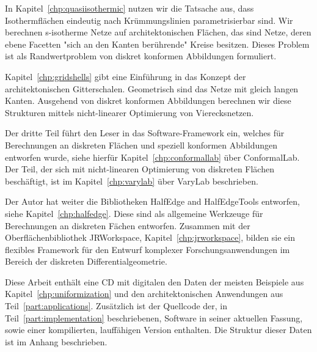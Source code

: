 \documentclass[Thesis.tex]{subfiles}
\begin{document}
In Kapitel~\ref{chp:quasiisothermic} nutzen wir die Tatsache aus, dass Isothermfl\"{a}chen eindeutig nach Kr\"{u}mmungslinien parametrisierbar sind.
Wir berechnen s-isotherme Netze auf architektonischen Fl\"{a}chen, das sind Netze, deren ebene Facetten "sich an den Kanten ber\"{u}hrende" Kreise besitzen.
Dieses Problem ist als Randwertproblem von diskret konformen Abbildungen formuliert.

Kapitel~\ref{chp:gridshells} gibt eine Einf\"{u}hrung in das Konzept der architektonischen Gitterschalen.
Geometrisch sind das Netze mit gleich langen Kanten.
Ausgehend von diskret konformen Abbildungen berechnen wir diese Strukturen mittels nicht-linearer Optimierung von Vierecksnetzen.

Der dritte Teil f\"{u}hrt den Leser in das Software-Framework ein, welches f\"{u}r Berechnungen an diskreten Fl\"{a}chen und speziell konformen Abbildungen entworfen wurde, siehe hierf\"{u}r Kapitel~\ref{chp:conformallab} \"{u}ber {\sc ConformalLab}.
Der Teil, der sich mit nicht-linearen Optimierung von diskreten Fl\"{a}chen besch\"{a}ftigt, ist im Kapitel~\ref{chp:varylab} \"{u}ber {\sc VaryLab} beschrieben.

Der Autor hat weiter die Bibliotheken {\sc HalfEdge} and {\sc HalfEdgeTools} entworfen, siehe Kapitel~\ref{chp:halfedge}.
Diese sind als allgemeine Werkzeuge f\"ur Berechnungen an diskreten F\"{a}chen entworfen.
Zusammen mit der Oberfl\"{a}chenbibliothek {\sc JRWorkspace}, Kapitel~\ref{chp:jrworkspace}, bilden sie ein flexibles Framework f\"{u}r den Entwurf komplexer Forschungsanwendungen im Bereich der diskreten Differentialgeometrie.

Diese Arbeit enth\"{a}lt eine CD mit digitalen den Daten der meisten Beispiele aus Kapitel~\ref{chp:uniformization} und den architektonischen Anwendungen aus Teil~\ref{part:applications}.
Zus\"{a}tzlich ist der Quellcode der, in Teil~\ref{part:implementation} beschriebenen, Software in seiner aktuellen Fassung, sowie einer kompilierten, lauff\"{a}higen Version enthalten.
Die Struktur dieser Daten ist im Anhang beschrieben.

\subfilebibliography
\end{document}
